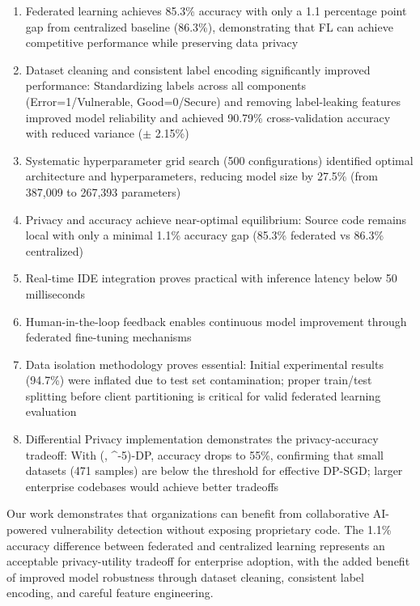 \documentclass[conference]{IEEEtran}
\begin{document}
\begin{enumerate}
    \item Federated learning achieves 85.3\% accuracy with only a 1.1 percentage point gap from centralized baseline (86.3\%), demonstrating that FL can achieve competitive performance while preserving data privacy
    
    \item Dataset cleaning and consistent label encoding significantly improved performance: Standardizing labels across all components (Error=1/Vulnerable, Good=0/Secure) and removing label-leaking features improved model reliability and achieved 90.79\% cross-validation accuracy with reduced variance ($\pm$ 2.15\%)
    
    \item Systematic hyperparameter grid search (500 configurations) identified optimal architecture and hyperparameters, reducing model size by 27.5\% (from 387,009 to 267,393 parameters)
    
    \item Privacy and accuracy achieve near-optimal equilibrium: Source code remains local with only a minimal 1.1\% accuracy gap (85.3\% federated vs 86.3\% centralized)
    
    \item Real-time IDE integration proves practical with inference latency below 50 milliseconds
    
    \item Human-in-the-loop feedback enables continuous model improvement through federated fine-tuning mechanisms
    
    \item Data isolation methodology proves essential: Initial experimental results (94.7\%) were inflated due to test set contamination; proper train/test splitting before client partitioning is critical for valid federated learning evaluation
    
    \item Differential Privacy implementation demonstrates the privacy-accuracy tradeoff: With (, ^{-5})-DP, accuracy drops to 55\%, confirming that small datasets (471 samples) are below the threshold for effective DP-SGD; larger enterprise codebases would achieve better tradeoffs
\end{enumerate}

Our work demonstrates that organizations can benefit from collaborative AI-powered vulnerability detection without exposing proprietary code. The 1.1\% accuracy difference between federated and centralized learning represents an acceptable privacy-utility tradeoff for enterprise adoption, with the added benefit of improved model robustness through dataset cleaning, consistent label encoding, and careful feature engineering.
\end{document}
